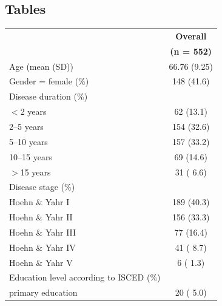 \documentclass{bmcart}
\begin{document}
\begin{backmatter}
\section*{Tables}
\begin{table}[!ht]
\begin{tabular}{p{5cm} c}
\toprule
																		&	\textbf{Overall}	\\ %
																		& 	\textbf{(n = 552)}\\ 
\midrule
Age (mean (SD)) 															& 	66.76 (9.25) 	\\ \hline
Gender = female (\%) 														&  	148 (41.6)  		\\ \hline
Disease duration (\%) 														& 				\\ \hline
\hspace{3mm} $<$2 years 													& 	62 (13.1) 		\\ \hline
\hspace{3mm} 2--5 years 													& 	154 (32.6) 		\\ \hline
\hspace{3mm} 5--10 years 													& 	157 (33.2) 		\\ \hline
\hspace{3mm} 10--15 years 													& 	69 (14.6) 		\\ \hline
\hspace{3mm} $>$15 years													& 	31 ( 6.6) 		\\ \hline
Disease stage (\%)															& 				\\ \hline
\hspace{3mm} Hoehn \& Yahr I 												&  	189 (40.3) 		\\ \hline
\hspace{3mm} Hoehn \& Yahr II 												& 	156 (33.3)  		\\ \hline
\hspace{3mm} Hoehn \& Yahr III  												&   	77 (16.4) 		\\ \hline
\hspace{3mm} Hoehn \& Yahr IV  												& 	41 ( 8.7) 		\\ \hline
\hspace{3mm} Hoehn \& Yahr V  												&     	6 ( 1.3) 		\\ \hline
Education level according \newline to ISCED (\%) 									& 				\\ \hline
\hspace{3mm} primary education  												& 	20 ( 5.0) 		\\ \hline

\end{tabular}
\end{table}
\end{backmatter}
\end{document}
